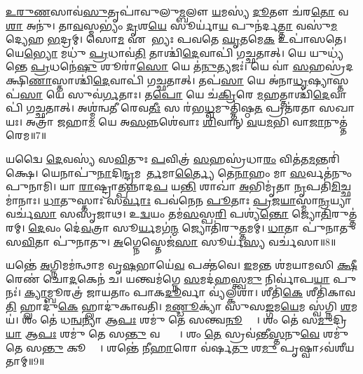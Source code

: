 \ul{𑌉}\ul{𑌰𑍁}\ul{𑌣}𑌸𑌾𑌵॑\ul{𑌸𑍁}𑌤𑍃𑌪𑌾॑𑌵𑍁𑌲𑍁\ul{𑌮𑍍𑌬}𑌲𑍗 \ul{𑌯}𑌮𑌸𑍍𑌯॑ \ul{𑌦𑍂}𑌤𑍗 𑌚॑𑌰\ul{𑌤𑍋} 𑌵\ul{𑌶𑌾}\ul{} 𑌅𑌨𑍁॑। 
𑌤𑌾\ul{𑌵}𑌸𑍍𑌮𑌭𑍍𑌯𑌂॑ \ul{𑌦𑍃}𑌶\ul{𑌯𑍇} 𑌸𑍂𑌰𑍍𑌯𑌾॑\ul{𑌯} 𑌪𑍁𑌨॑𑌰𑍍𑌦\ul{𑌤𑍍𑌤𑌾} 𑌵𑌸𑍁॑\ul{𑌮}𑌦𑍍𑌯𑍇𑌹 \ul{𑌭}𑌦𑍍𑌰𑌮𑍍। 
𑌸𑍋\ul{𑌮} 𑌏𑌕𑍇᳚𑌭𑍍𑌯𑌃 𑌪𑌵𑌤𑍇 \ul{𑌘𑍃}𑌤𑌮𑍇\ul{𑌕} 𑌉𑌪𑌾॑𑌸𑌤𑍇। 
𑌯𑍇\ul{𑌭𑍍𑌯𑍋} 𑌮𑌧𑍁॑ \ul{𑌪𑍍𑌰}𑌧𑌾𑌵॑\ul{𑌤𑌿} 𑌤𑌾𑌶𑍍𑌚𑌿॑\ul{𑌦𑍇}𑌵𑌾𑌪𑌿॑ 𑌗𑌚𑍍𑌛𑌤𑌾𑌤𑍍। 
𑌯𑍇 𑌯𑍁𑌧𑍍𑌯॑𑌨𑍍𑌤𑍇 \ul{𑌪𑍍𑌰}𑌧𑌨𑍇॑\ul{𑌷𑍁} 𑌶𑍂𑌰𑌾॑\ul{𑌸𑍋} 𑌯𑍇 𑌤॑\ul{𑌨𑍁}𑌤𑍍𑌯𑌜𑌃॑। 
𑌯𑍇 𑌵𑌾॑ \ul{𑌸}𑌹𑌸𑍍𑌰॑𑌦𑌕𑍍𑌷𑌿\ul{𑌣𑌾}𑌸𑍍𑌤𑌾𑌶𑍍𑌚𑌿॑\ul{𑌦𑍇}𑌵𑌾𑌪𑌿॑ 𑌗𑌚𑍍𑌛𑌤𑌾𑌤𑍍। 
𑌤𑌪॑\ul{𑌸𑌾} 𑌯𑍇 𑌅॑𑌨𑌾\ul{𑌧𑍃}𑌷𑍍𑌯𑌾𑌸𑍍𑌤𑌪॑\ul{𑌸𑌾} 𑌯𑍇 𑌸𑍁𑌵॑\ul{𑌰𑍍𑌗}𑌤𑌾𑌃। 
𑌤\ul{𑌪𑍋} 𑌯𑍇 𑌚॑\ul{𑌕𑍍𑌰𑌿}𑌰𑍇 \ul{𑌮}𑌹𑌤𑍍𑌤𑌾𑌶𑍍𑌚𑌿॑\ul{𑌦𑍇}𑌵𑌾𑌪𑌿॑ 𑌗𑌚𑍍𑌛𑌤𑌾𑌤𑍍। 
𑌅𑌶𑍍𑌮॑𑌨𑍍𑌵𑌤𑍀 𑌰𑍇𑌵\ul{𑌤𑍀𑌃} 𑌸 𑌰॑𑌭\ul{𑌧𑍍𑌵}𑌮𑍁𑌤𑍍𑌤𑌿॑𑌷𑍍𑌠\ul{𑌤} 𑌪𑍍𑌰𑌤॑𑌰𑌤𑌾 𑌸𑌖𑌾𑌯𑌃। 
𑌅𑌤𑍍𑌰𑌾॑ 𑌜𑌹𑌾\ul{𑌮} 𑌯𑍇 𑌅\ul{𑌸}𑌨𑍍𑌨𑌶𑍇॑𑌵𑌾𑌃  \ul{𑌶𑌿}𑌵𑌾𑌨𑍍 \ul{𑌵}𑌯\ul{𑌮}𑌭𑌿 𑌵𑌾\ul{𑌜𑌾}𑌨𑍁𑌤𑍍𑌤॑𑌰𑍇𑌮॥7॥

𑌯𑌦𑍍𑌵𑍈 \ul{𑌦𑍇}𑌵𑌸𑍍𑌯॑ 𑌸\ul{𑌵𑌿}𑌤𑍁𑌃 \ul{𑌪}𑌵𑌿𑌤𑍍𑌰॑ \ul{𑌸}𑌹𑌸𑍍𑌰॑𑌧𑌾\ul{𑌰𑌂}  𑌵𑌿𑌤॑𑌤\ul{𑌮}𑌨𑍍𑌤𑌰𑌿॑𑌕𑍍𑌷𑍇। 
𑌯𑍇𑌨𑌾𑌪𑍁॑\ul{𑌨𑌾}𑌦𑌿\ul{𑌨𑍍𑌦𑍍𑌰}𑌮𑌨𑌾᳚\ul{𑌰𑍍𑌤}𑌮𑌾\ul{𑌰𑍍𑌤𑍍𑌯𑍈} 𑌤𑍇\ul{𑌨𑌾}𑌹𑌂 𑌮𑌾 \ul{𑌸}𑌰𑍍𑌵𑌤॑𑌨𑍁𑌂 𑌪𑍁𑌨𑌾𑌮𑌿। 
𑌯𑌾 \ul{𑌰𑌾}𑌷𑍍𑌟𑍍𑌰𑌾\ul{𑌤𑍍𑌪}𑌨𑍍𑌨𑌾𑌦\ul{𑌪} 𑌯\ul{𑌨𑍍𑌤𑌿} 𑌶𑌾𑌖𑌾॑ \ul{𑌅}𑌭𑌿𑌮𑍃॑𑌤𑌾 \ul{𑌨𑍃}𑌪𑌤𑌿॑\ul{𑌮𑌿}𑌚𑍍𑌛𑌮𑌾॑𑌨𑌾𑌃। 
\ul{𑌧𑌾}𑌤𑍁𑌸𑍍𑌤𑌾𑌃 𑌸\ul{𑌰𑍍𑌵𑌾𑌃} 𑌪𑌵॑𑌨𑍇𑌨 \ul{𑌪𑍂}𑌤𑌾𑌃 \ul{𑌪𑍍𑌰}𑌜\ul{𑌯𑌾}𑌸𑍍𑌮𑌾\ul{𑌨𑍍𑌰}𑌯𑍍𑌯𑌾 𑌵𑌰𑍍𑌚॑\ul{𑌸𑌾} 𑌸𑌸𑍃॑𑌜𑌾𑌥। 
𑌉\ul{𑌦𑍍𑌵}𑌯𑌂 𑌤𑌮॑\ul{𑌸}𑌸𑍍𑌪\ul{𑌰𑌿} 𑌪𑌶𑍍𑌯॑\ul{𑌨𑍍𑌤𑍋} 𑌜𑍍𑌯𑍋\ul{𑌤𑌿}𑌰𑍁𑌤𑍍𑌤॑𑌰𑌮𑍍। 
\ul{𑌦𑍇}𑌵𑌂 𑌦𑍇॑\ul{𑌵}𑌤𑍍𑌰𑌾 𑌸𑍂\ul{𑌰𑍍𑌯}𑌮𑌗॑\ul{𑌨𑍍𑌮} 𑌜𑍍𑌯𑍋𑌤𑌿॑𑌰𑍁\ul{𑌤𑍍𑌤}𑌮𑌮𑍍। 
\ul{𑌧𑌾}𑌤𑌾 𑌪𑍁॑𑌨𑌾𑌤𑍁 𑌸\ul{𑌵𑌿}𑌤𑌾 𑌪𑍁॑𑌨𑌾𑌤𑍁। 
\ul{𑌅}𑌗𑍍𑌨𑍇𑌸𑍍𑌤𑍇𑌜॑\ul{𑌸𑌾} 𑌸𑍂𑌰𑍍𑌯॑\ul{𑌸𑍍𑌯} 𑌵𑌰𑍍𑌚॑𑌸𑌾॥8॥
\anuvakamend[\ul{𑌧𑍇}𑌹𑍍𑌯𑍁𑌤𑍍𑌤॑𑌰𑍇\ul{𑌮𑌾}𑌷𑍍𑌟𑍗 𑌚॑]

𑌯𑌨𑍍𑌤𑍇॑ \ul{𑌅}𑌗𑍍𑌨𑌿𑌮𑌮॑𑌨𑍍𑌥𑌾𑌮 𑌵𑍃\ul{𑌷}𑌭𑌾𑌯𑍇॑\ul{𑌵} 𑌪𑌕𑍍𑌤॑𑌵𑍇। 
\ul{𑌇}𑌮𑌨𑍍𑌤 𑌶॑𑌮𑌯𑌾𑌮𑌸𑌿 \ul{𑌕𑍍𑌷𑍀}𑌰𑍇𑌣॑ 𑌚𑍋\ul{𑌦}𑌕𑍇𑌨॑ 𑌚। 
𑌯𑌨𑍍𑌤𑍍𑌵𑌮॑𑌗𑍍𑌨𑍇 \ul{𑌸}𑌮𑌦॑\ul{𑌹}𑌸𑍍𑌤𑍍𑌵\ul{𑌮𑍁} 𑌨𑌿𑌰𑍍𑌵𑌾॑𑌪\ul{𑌯𑌾} 𑌪𑍁𑌨𑌃॑। 
\ul{𑌕𑍍𑌯𑌾}𑌮𑍍𑌬𑍂𑌰𑌤𑍍𑌰॑ 𑌜𑌾𑌯𑌤𑌾𑌂 𑌪𑌾𑌕\ul{𑌦𑍂}𑌰𑍍𑌵𑌾 𑌵𑍍𑌯॑𑌲𑍍𑌕𑌶𑌾। 
𑌶𑍀𑌤𑌿॑\ul{𑌕𑍇} 𑌶𑍀𑌤𑌿॑𑌕𑌾𑌵\ul{𑌤𑌿} 𑌹𑍍𑌲𑌾𑌦𑍁॑\ul{𑌕𑍇} 𑌹𑍍𑌲𑌾𑌦𑍁॑𑌕𑌾𑌵𑌤𑌿। 
\ul{𑌮}\ul{𑌣𑍍𑌡𑍂}𑌕𑍍𑌯𑌾॑ 𑌸𑍁𑌸\ul{𑌙𑍍𑌗}𑌮\ul{𑌯𑍇}𑌮 𑌸𑍍𑌵॑𑌗𑍍𑌨𑌿 \ul{𑌶}𑌮𑌯॑। 
𑌶𑌂 𑌤𑍇॑ 𑌧\ul{𑌨𑍍𑌵}𑌨𑍍𑌯𑌾 𑌆\ul{𑌪𑌃} 𑌶𑌮𑍁॑ 𑌤𑍇 𑌸𑌨𑍍𑌤𑍍𑌵\ul{𑌨𑍂}𑌕𑍍𑌯𑌾𑌃᳚। 
𑌶𑌂 𑌤𑍇॑ 𑌸\ul{𑌮𑍁}𑌦𑍍𑌰𑌿\ul{𑌯𑌾} 𑌆\ul{𑌪𑌃} 𑌶𑌮𑍁॑ 𑌤𑍇 𑌸\ul{𑌨𑍍𑌤𑍁} 𑌵𑌰𑍍𑌷𑍍𑌯𑌾𑌃᳚। 
𑌶𑌂 \ul{𑌤𑍇} 𑌸𑍍𑌰𑌵॑𑌨𑍍𑌤𑍀\ul{𑌸𑍍𑌤}𑌨𑍁\ul{𑌵𑍇} 𑌶𑌮𑍁॑ 𑌤𑍇 𑌸\ul{𑌨𑍍𑌤𑍁} 𑌕𑍂𑌪𑍍𑌯𑌾𑌃᳚। 
𑌶𑌨𑍍𑌤𑍇॑ 𑌨𑍀\ul{𑌹𑌾}𑌰𑍋 𑌵॑𑌰𑍍\mbox{}𑌷\ul{𑌤𑍁} 𑌶\ul{𑌮𑍁} 𑌪𑍃𑌷𑍍𑌵𑌾𑌽𑌵॑𑌶𑍀𑌯𑌤𑌾𑌮𑍍॥9॥

